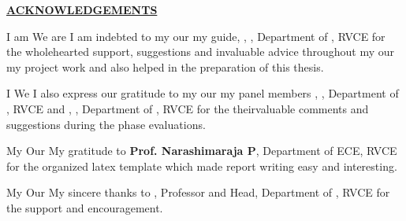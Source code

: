 \thispagestyle{empty}
\ifIDP \vspace{-1cm}\fi
\begin{center}
	\Large\textbf{\underline{ACKNOWLEDGEMENTS}} \par
\end{center}

\ifPG I am \else
\ifStuNameBUsed We are \else I am \fi\fi indebted to \ifPG my \else\ifStuNameBUsed our \else my \fi\fi guide, \textbf{\printGuideNameA}, \printGuideDesigA, Department of \printGuideDeptAInSF, RVCE for the wholehearted support, suggestions and invaluable advice throughout \ifPG my \else\ifStuNameBUsed our \else my \fi\fi project work and also helped in the preparation of this thesis.\\ \par

\ifPG I \else \ifStuNameBUsed We \else I \fi\fi also express our gratitude to \ifPG my \else\ifStuNameBUsed our \else my \fi\fi  panel member\ifIDP\space\else s \fi\textbf{\printPanelMemberA}, \printPanelMemberDesigA, Department of \printPanelMemberDeptAInSF, RVCE \ifIDP \else and \textbf{\printPanelMemberB}, \printPanelMemberDesigB , Department of \printPanelMemberDeptBInSF, RVCE \fi for \ifPanelMemBUsed the \else their\fi valuable comments and suggestions during the phase evaluations. \\ \par



\ifPG My \else \ifStuNameBUsed Our \else My \fi\fi gratitude to \textbf{Prof. Narashimaraja P}, Department of ECE, RVCE for the organized latex template which made report writing easy and interesting.\\ \par


\ifPG My \else \ifStuNameBUsed Our \else My \fi\fi sincere thanks to \textbf{\printHOD}, Professor and Head, Department of \ifIDP \printGuideDeptAInLF\else\printDepartmentLF\fi, RVCE for the support and encouragement.\\ \par

